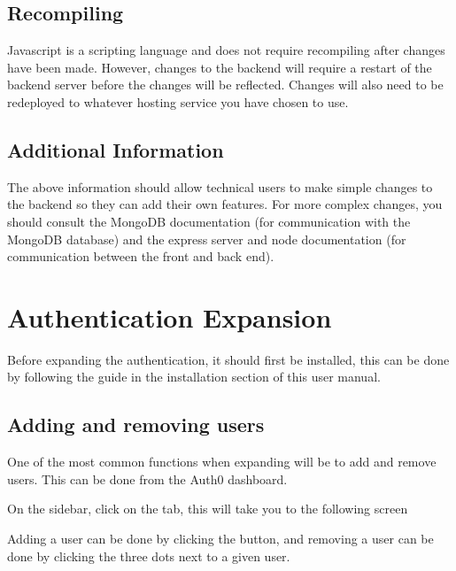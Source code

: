 \documentclass[letterpaper,10pt,english]{sphinxmanual}
\let\sphinxpxdimen\pdfpxdimen\else\newdimen\sphinxpxdimen
\let\oldsubsection\subsection
\renewcommand{\subsection}{\needspace{6\baselineskip}\oldsubsection}
\begin{document}
\subsection{Recompiling}
\label{\detokenize{docs/Expansion/api-expansion:recompiling}}
Javascript is a scripting language and does not require recompiling
after changes have been made. However, changes to the back\sphinxhyphen{}end will
require a restart of the back\sphinxhyphen{}end server before the changes will be
reflected. Changes will also need to be redeployed to whatever hosting
service you have chosen to use.


\subsection{Additional Information}
\label{\detokenize{docs/Expansion/api-expansion:additional-information}}
The above information should allow technical users to make simple
changes to the back\sphinxhyphen{}end so they can add their own features. For more
complex changes, you should consult the MongoDB documentation (for
communication with the MongoDB database) and the express server and node
documentation (for communication between the front and back end).


\section{Authentication Expansion}
\label{\detokenize{docs/Expansion/auth-expansion:authentication-expansion}}\label{\detokenize{docs/Expansion/auth-expansion::doc}}
Before expanding the authentication, it should first be installed, this
can be done by following the guide in the installation section of this
user manual.


\subsection{Adding and removing users}
\label{\detokenize{docs/Expansion/auth-expansion:adding-and-removing-users}}
One of the most common functions when expanding will be to add and
remove users. This can be done from the Auth0 dashboard.

On the sidebar, click on the  tab, this will take you
to the following screen

\noindent\sphinxincludegraphics[width=300\sphinxpxdimen]{{add_users}.png}

Adding a user can be done by clicking the  button, and
removing a user can be done by clicking the three dots next to a given
user.
\end{document}
